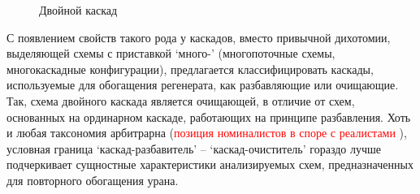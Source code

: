 \begin{figure}[ht]
  \caption{Двойной каскад}\label{fig:double}
\end{figure}

С появлением свойств такого рода у каскадов, вместо привычной дихотомии, выделяющей схемы с приставкой `много-' (многопоточные схемы, многокаскадные конфигурации), предлагается классифицировать каскады, используемые для обогащения регенерата, как разбавляющие или очищающие. Так, схема двойного каскада является очищающей, в отличие от схем, основанных на ординарном каскаде, работающих на принципе разбавления.  Хоть и любая таксономия арбитрарна (\textcolor{red}{позиция номиналистов в споре с реалистами}
), условная граница `каскад-разбавитель' -- `каскад-очиститель' гораздо лучше подчеркивает сущностные характеристики анализируемых схем, предназначенных для повторного обогащения урана.
 

